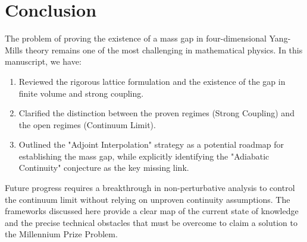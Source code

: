 \section{Conclusion}
\label{sec:conclusion}

The problem of proving the existence of a mass gap in four-dimensional Yang-Mills theory remains one of the most challenging in mathematical physics. In this manuscript, we have:

\begin{enumerate}
    \item Reviewed the rigorous lattice formulation and the existence of the gap in finite volume and strong coupling.
    \item Clarified the distinction between the proven regimes (Strong Coupling) and the open regimes (Continuum Limit).
    \item Outlined the "Adjoint Interpolation" strategy as a potential roadmap for establishing the mass gap, while explicitly identifying the "Adiabatic Continuity" conjecture as the key missing link.
\end{enumerate}

Future progress requires a breakthrough in non-perturbative analysis to control the continuum limit without relying on unproven continuity assumptions. The frameworks discussed here provide a clear map of the current state of knowledge and the precise technical obstacles that must be overcome to claim a solution to the Millennium Prize Problem.
